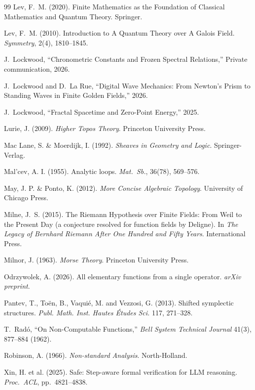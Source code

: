 \begin{thebibliography}{99}
Lev, F.~M. (2020).
Finite Mathematics as the Foundation of Classical Mathematics and Quantum Theory.
Springer.

Lev, F.~M. (2010).
Introduction to A Quantum Theory over A Galois Field.
\emph{Symmetry}, 2(4), 1810--1845.

J.~Lockwood,
``Chronometric Constants and Frozen Spectral Relations,''
Private communication, 2026.

J.~Lockwood and D.~La Rue,
``Digital Wave Mechanics: From Newton's Prism to Standing Waves
in Finite Golden Fields,'' 2026.

J.~Lockwood,
``Fractal Spacetime and Zero-Point Energy,'' 2025.

Lurie, J. (2009). \emph{Higher Topos Theory}. Princeton University Press.

Mac Lane, S. \& Moerdijk, I. (1992). \emph{Sheaves in Geometry and Logic}. Springer-Verlag.

Mal'cev, A. I. (1955). Analytic loops. \emph{Mat.\ Sb.}, 36(78), 569--576.

May, J. P. \& Ponto, K. (2012). \emph{More Concise Algebraic Topology}. University of Chicago Press.

Milne, J.~S. (2015).
The Riemann Hypothesis over Finite Fields: From Weil to the Present Day (a conjecture resolved for function fields by Deligne).
In \emph{The Legacy of Bernhard Riemann After One Hundred and Fifty Years}. International Press.

Milnor, J. (1963). \emph{Morse Theory}. Princeton University Press.

Odrzywolek, A. (2026). All elementary functions from a single operator. \emph{arXiv preprint}.

Pantev, T., To\"en, B., Vaqui\'e, M. and Vezzosi, G. (2013). Shifted symplectic structures. \emph{Publ. Math. Inst. Hautes \'Etudes Sci.} 117, 271--328.

T.~Rad\'o,
``On Non-Computable Functions,''
\emph{Bell System Technical Journal} 41(3), 877--884 (1962).

Robinson, A. (1966). \emph{Non-standard Analysis}. North-Holland.

Xin, H. et al. (2025). Safe: Step-aware formal verification for LLM reasoning. \emph{Proc.\ ACL}, pp.~4821--4838.


\end{thebibliography}
